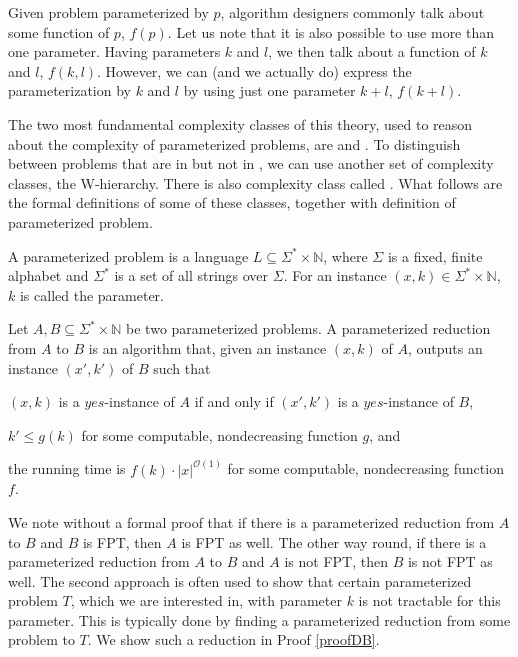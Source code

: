 Given problem parameterized by $p$, algorithm designers commonly talk about some function of $p$, $f(p)$.
Let us note that it is also possible to use more than one parameter.
Having parameters $k$ and $l$, we then talk about a function of $k$ and $l$, $f(k,l)$.
However, we can (and we actually do) express the parameterization by $k$ and $l$ by using just one parameter $k+l$, $f(k+l)$.

The two most fundamental complexity classes of this theory, used to reason about the complexity of parameterized problems,
are \FPT and \XP.
To distinguish between \NPh problems that are in \XP but not in \FPT, we can use another set of complexity classes, the W-hierarchy.
There is also complexity class called \pNP.
What follows are the formal definitions of some of these classes, together with definition of parameterized problem.   

\begin{definition}
    A parameterized problem is a language $L \subseteq \Sigma^* \times \mathbb{N}$, where
    $\Sigma$ is a fixed, finite alphabet and $\Sigma^*$ is a set of all strings over $\Sigma$.
    For an instance $(x, k) \in \Sigma^* \times \mathbb{N}$, $k$ is called the parameter.
\end{definition}

\begin{definition}
    Let $A,B \subseteq \Sigma^* \times \mathbb{N}$ be two parameterized problems.
    A parameterized reduction from $A$ to $B$ is an algorithm that, given an instance $(x, k)$ of $A$,
    outputs an instance $(x', k')$ of $B$ such that
    \begin{description}
        \item $(x, k)$ is a $yes$-instance of $A$ if and only if $(x', k')$ is a $yes$-instance of $B$,
        \item $k' \leq g(k)$ for some computable, nondecreasing function $g$, and
        \item the running time is $f(k) \cdot |x|^{\mathcal{O}(1)}$ for some computable, nondecreasing function $f$.
    \end{description}
\end{definition}

We note without a formal proof that if there is a parameterized reduction from $A$ to $B$ and $B$ is FPT,
then $A$ is FPT as well.
The other way round, if there is a parameterized reduction from $A$ to $B$ and $A$ is not FPT,
then $B$ is not FPT as well.
The second approach is often used to show that certain parameterized problem $T$, which we are interested in,
with parameter $k$ is not tractable for this parameter.
This is typically done by finding a parameterized reduction from some \Wh problem to $T$.
We show such a reduction in Proof \ref{proofDB}.

